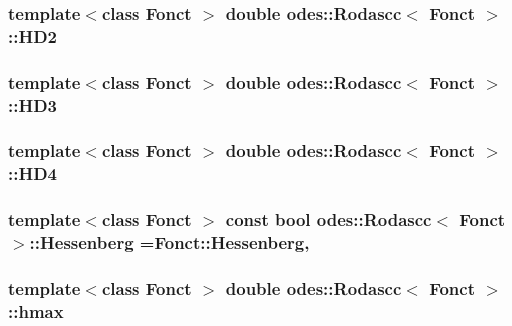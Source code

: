 \hypertarget{classodes_1_1Rodascc_a1ebd6d7c1a6e10cec6139596ad6efd7e}{
\subsubsection[{H\-D2}]{\setlength{\rightskip}{0pt plus 5cm}template$<$class Fonct $>$ double {\bf odes\-::\-Rodascc}$<$ Fonct $>$\-::H\-D2\hspace{0.3cm}{\ttfamily [private]}}}\label{classodes_1_1Rodascc_a1ebd6d7c1a6e10cec6139596ad6efd7e}
\hypertarget{classodes_1_1Rodascc_a16f219bb396cf7d729f497893d494487}{
\subsubsection[{H\-D3}]{\setlength{\rightskip}{0pt plus 5cm}template$<$class Fonct $>$ double {\bf odes\-::\-Rodascc}$<$ Fonct $>$\-::H\-D3\hspace{0.3cm}{\ttfamily [private]}}}\label{classodes_1_1Rodascc_a16f219bb396cf7d729f497893d494487}
\hypertarget{classodes_1_1Rodascc_a3c724cc9b41bd776cac438a6b2f6c1ce}{
\subsubsection[{H\-D4}]{\setlength{\rightskip}{0pt plus 5cm}template$<$class Fonct $>$ double {\bf odes\-::\-Rodascc}$<$ Fonct $>$\-::H\-D4\hspace{0.3cm}{\ttfamily [private]}}}\label{classodes_1_1Rodascc_a3c724cc9b41bd776cac438a6b2f6c1ce}
\hypertarget{classodes_1_1Rodascc_ab0e70822d886ddc3019ffa890e38cbfc}{
\subsubsection[{Hessenberg}]{\setlength{\rightskip}{0pt plus 5cm}template$<$class Fonct $>$ const bool {\bf odes\-::\-Rodascc}$<$ Fonct $>$\-::Hessenberg =Fonct\-::\-Hessenberg\hspace{0.3cm}{\ttfamily [static]}, {\ttfamily [private]}}}\label{classodes_1_1Rodascc_ab0e70822d886ddc3019ffa890e38cbfc}
\hypertarget{classodes_1_1Rodascc_a14d86ab149e2cf6c15606369441571ac}{
\subsubsection[{hmax}]{\setlength{\rightskip}{0pt plus 5cm}template$<$class Fonct $>$ double {\bf odes\-::\-Rodascc}$<$ Fonct $>$\-::hmax\hspace{0.3cm}{\ttfamily [private]}}}\label{classodes_1_1Rodascc_a14d86ab149e2cf6c15606369441571ac}
